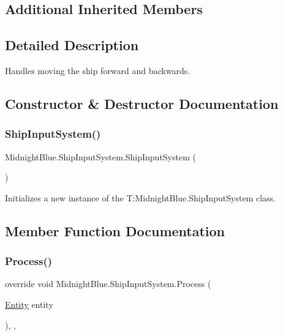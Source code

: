 \subsection*{Additional Inherited Members}


\subsection{Detailed Description}
Handles moving the ship forward and backwards. 



\subsection{Constructor \& Destructor Documentation}
\hypertarget{class_midnight_blue_1_1_ship_input_system_ad7f804f91939a651c8e53ddb6bf55db6}{}\label{class_midnight_blue_1_1_ship_input_system_ad7f804f91939a651c8e53ddb6bf55db6} 
\subsubsection{\texorpdfstring{Ship\+Input\+System()}{ShipInputSystem()}}
{\footnotesize\ttfamily Midnight\+Blue.\+Ship\+Input\+System.\+Ship\+Input\+System (\begin{DoxyParamCaption}{ }\end{DoxyParamCaption})\hspace{0.3cm}{\ttfamily [inline]}}



Initializes a new instance of the T\+:\+Midnight\+Blue.\+Ship\+Input\+System class. 



\subsection{Member Function Documentation}
\hypertarget{class_midnight_blue_1_1_ship_input_system_ac504beb5b6afa47ca4618d9683e46946}{}\label{class_midnight_blue_1_1_ship_input_system_ac504beb5b6afa47ca4618d9683e46946} 
\subsubsection{\texorpdfstring{Process()}{Process()}}
{\footnotesize\ttfamily override void Midnight\+Blue.\+Ship\+Input\+System.\+Process (\begin{DoxyParamCaption}\item[{\hyperlink{class_midnight_blue_1_1_engine_1_1_entity_component_1_1_entity}{Entity}}]{entity }\end{DoxyParamCaption})\hspace{0.3cm}{\ttfamily [inline]}, {\ttfamily [protected]}, {\ttfamily [virtual]}}



